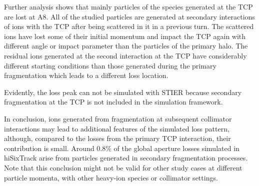 Further analysis shows that mainly particles of the species  generated at the TCP are lost at A8. All of the studied particles are generated at secondary interactions of \lead ions with the TCP after being scattered in it in a previous turn. The scattered \lead ions have lost some of their initial momentum and impact the TCP again with different angle or impact parameter than the particles of the primary halo. The residual  ions generated at the second interaction at the TCP have considerably different starting conditions than those generated during the primary fragmentation which leads to a different loss location. 

Evidently, the loss peak can not be simulated with STIER because secondary fragmentation at the TCP is not included in the simulation framework. 

In conclusion, ions generated from fragmentation at subsequent collimator interactions may lead to additional features of the simulated loss pattern, although, compared to the losses from the primary TCP interaction, their contribution is small. Around 0.8\% of the global aperture losses simulated in hiSixTrack arise from particles generated in secondary fragmentation processes. Note that this conclusion might not be valid for other study cases at different particle momenta, with other heavy-ion species or collimator settings.